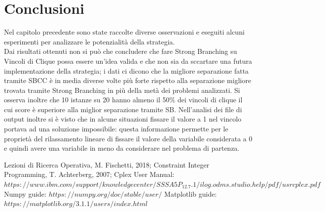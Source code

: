 \documentclass[12pt,a4paper,twoside,openright]{book}
\begin{document}
\chapter{Conclusioni}
Nel capitolo precedente sono state raccolte diverse osservazioni e eseguiti alcuni esperimenti per 
analizzare le potenzialità della strategia. \\Dai risultati ottenuti non si può che concludere che
fare Strong Branching su Vincoli di Clique possa essere un'idea valida e che non sia da sccartare una 
futura implementazione della strategia; i dati ci dicono che la migliore separazione fatta tramite SBCC è in media
diverse volte più forte rispetto alla separazione migliore trovata tramite Strong Branching in più della 
metà dei problemi analizzati. Si osserva inoltre che 10 istanze su 20 hanno almeno il 50\% dei vincoli di clique il cui score
è superiore alla miglior separazione tramite SB. Nell'analisi dei file di output inoltre si è visto che in 
alcune situazioni fissare il valore a 1 nel vincolo portava ad una soluzione impossibile: questa informazione permette 
per le proprietà del rilassamento lineare di fissare il valore della variabile considerata a 0 e quindi
avere una variabile in meno da considerare nel problema di partenza.


\renewcommand{\bibname}{Bibliografia/Sitografia}
\begin{thebibliography}{100}
    \bibitem{} Lezioni di Ricerca Operativa, M. Fischetti, 2018;
    \bibitem{} Constraint Integer Programming, T. Achterberg, 2007;
    \bibitem{} Cplex User Manual: \\ 
    $https://www.ibm.com/support/knowledgecenter/SSSA5P_12.7.1/ilog.odms.studio.help/pdf/usrcplex.pdf$
    \bibitem{} Numpy guide: $https://numpy.org/doc/stable/user/$
    \bibitem{} Matplotlib guide: $https://matplotlib.org/3.1.1/users/index.html$ 
\end{thebibliography}
\end{document}
